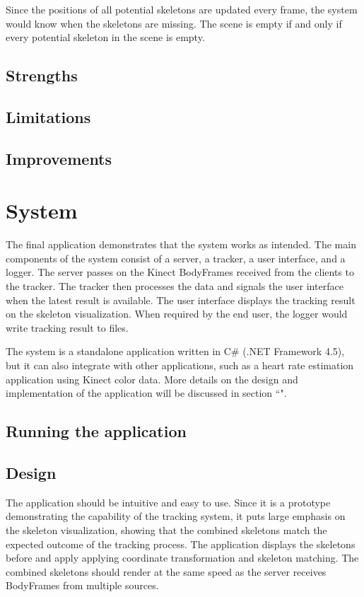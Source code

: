 \documentclass{sigchi}
\begin{document}
Since the positions of all potential skeletons are updated every frame, the system would know when the skeletons are missing. The scene is empty if and only if every potential skeleton in the scene is empty.

\subsection{Strengths}

\subsection{Limitations}

\subsection{Improvements}

\section{System}
\label{sec:system}

The final application demonstrates that the system works as intended. The main components of the system consist of a server, a tracker, a user interface, and a logger. The server passes on the Kinect BodyFrames received from the clients to the tracker. The tracker then processes the data and signals the user interface when the latest result is available. The user interface displays the tracking result on the skeleton visualization. When required by the end user, the logger would write tracking result to files.

The system is a standalone application written in C\# (.NET Framework 4.5), but it can also integrate with other applications, such as a heart rate estimation application using Kinect color data. More details on the design and implementation of the application will be discussed in section ``".

\subsection{Running the application}

\subsection{Design}

The application should be intuitive and easy to use. Since it is a prototype demonstrating the capability of the tracking system, it puts large emphasis on the skeleton visualization, showing that the combined skeletons match the expected outcome of the tracking process. The application displays the skeletons before and apply applying coordinate transformation and skeleton matching. The combined skeletons should render at the same speed as the server receives BodyFrames from multiple sources. 
\end{document}
